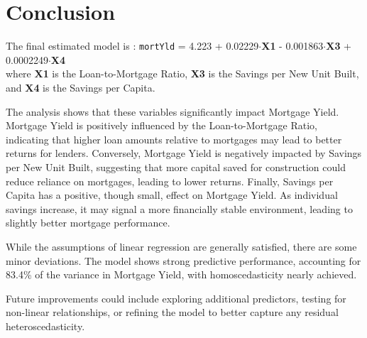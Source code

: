 \documentclass[
  11pt,
]{article}
\begin{document}
\vspace{-3em}

\section{Conclusion}\label{conclusion}

The final estimated model is : \texttt{mortYld} = 4.223 +
0.02229\(\cdot\)\textbf{X1} - 0.001863\(\cdot\)\textbf{X3} +
0.0002249\(\cdot\)\textbf{X4}\\
where \textbf{X1} is the Loan-to-Mortgage Ratio, \textbf{X3} is the
Savings per New Unit Built, and \textbf{X4} is the Savings per Capita.

The analysis shows that these variables significantly impact Mortgage
Yield. Mortgage Yield is positively influenced by the Loan-to-Mortgage
Ratio, indicating that higher loan amounts relative to mortgages may
lead to better returns for lenders. Conversely, Mortgage Yield is
negatively impacted by Savings per New Unit Built, suggesting that more
capital saved for construction could reduce reliance on mortgages,
leading to lower returns. Finally, Savings per Capita has a positive,
though small, effect on Mortgage Yield. As individual savings increase,
it may signal a more financially stable environment, leading to slightly
better mortgage performance.

While the assumptions of linear regression are generally satisfied,
there are some minor deviations. The model shows strong predictive
performance, accounting for 83.4\% of the variance in Mortgage Yield,
with homoscedasticity nearly achieved.

Future improvements could include exploring additional predictors,
testing for non-linear relationships, or refining the model to better
capture any residual heteroscedasticity.
\end{document}
